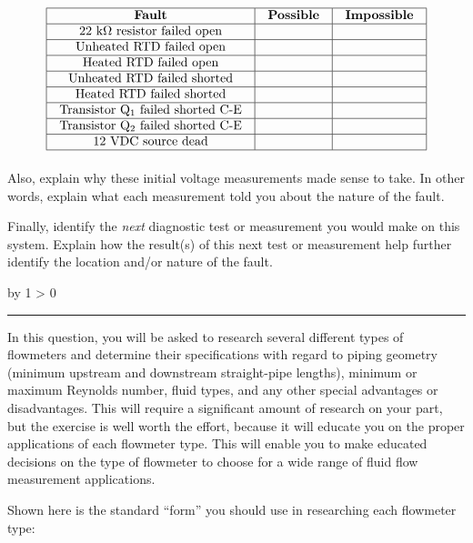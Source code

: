 \documentclass[12pt,a4paper]{article}
\def\oppgave{
            \advance\questnum by 1
            \ifnum \questnum > 0
                 \hrule
                 \vskip 3pt
                 \leftline{Oppgave \the\questnum}
                 \vskip 3pt \fi}
\begin{document}
$$\vbox{\offinterlineskip
\halign{\strut
\vrule \quad\hfil # \ \hfil & 
\vrule \quad\hfil # \ \hfil & 
\vrule \quad\hfil # \ \hfil \vrule \cr
\noalign{\hrule}
%
{\bf Fault} & {\bf Possible} & {\bf Impossible} \cr
%
\noalign{\hrule}
%
22 k$\Omega$ resistor failed open &  &  \cr
%
\noalign{\hrule}
%
Unheated RTD failed open &  &  \cr
%
\noalign{\hrule}
%
Heated RTD failed open &  &  \cr
%
\noalign{\hrule}
%
Unheated RTD failed shorted &  &  \cr
%
\noalign{\hrule}
%
Heated RTD failed shorted &  &  \cr
%
\noalign{\hrule}
%
Transistor Q$_1$ failed shorted C-E &  &  \cr
%
\noalign{\hrule}
%
Transistor Q$_2$ failed shorted C-E &  &  \cr
%
\noalign{\hrule}
%
12 VDC source dead &  &  \cr
%
\noalign{\hrule}
} %
}$$ %

Also, explain why these initial voltage measurements made sense to take.  In other words, explain what each measurement told you about the nature of the fault.  

Finally, identify the {\it next} diagnostic test or measurement you would make on this system.  Explain how the result(s) of this next test or measurement help further identify the location and/or nature of the fault.

\vskip 10pt \filbreak 
\oppgave{} 

In this question, you will be asked to research several different types of flowmeters and determine their specifications with regard to piping geometry (minimum upstream and downstream straight-pipe lengths), minimum or maximum Reynolds number, fluid types, and any other special advantages or disadvantages.  This will require a significant amount of research on your part, but the exercise is well worth the effort, because it will educate you on the proper applications of each flowmeter type.  This will enable you to make educated decisions on the type of flowmeter to choose for a wide range of fluid flow measurement applications.

Shown here is the standard ``form'' you should use in researching each flowmeter type:

\vskip 10pt
\end{document}
